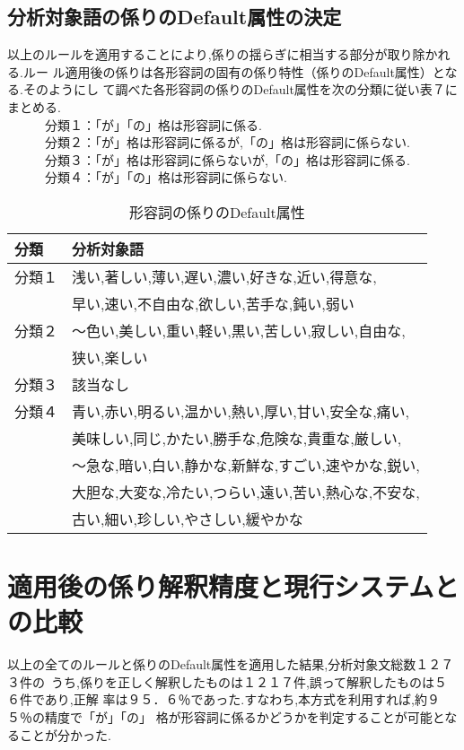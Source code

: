 \subsection{分析対象語の係りのDefault属性の決定}

以上のルールを適用することにより,係りの揺らぎに相当する部分が取り除かれる.ルー
ル適用後の係りは各形容詞の固有の係り特性（係りのDefault属性）となる.そのようにし
て調べた各形容詞の係りのDefault属性を次の分類に従い表７にまとめる.\\
　　　分類１：「が」「の」格は形容詞に係る.\\
　　　分類２：「が」格は形容詞に係るが,「の」格は形容詞に係らない.\\
　　　分類３：「が」格は形容詞に係らないが,「の」格は形容詞に係る.\\
　　　分類４：「が」「の」格は形容詞に係らない.
\begin{table}[h]
\caption{形容詞の係りのDefault属性}
\begin{center}
  \begin{tabular}{|l|l|} \hline
    分類 & 分析対象語 \\ \hline
    分類１ & 浅い,著しい,薄い,遅い,濃い,好きな,近い,得意な, \\
    & 早い,速い,不自由な,欲しい,苦手な,鈍い,弱い\\ \hline
    分類２ & 〜色い,美しい,重い,軽い,黒い,苦しい,寂しい,自由な,\\
    & 狭い,楽しい\\ \hline
    分類３ & 該当なし \\ \hline
    分類４ & 青い,赤い,明るい,温かい,熱い,厚い,甘い,安全な,痛い,\\
    & 美味しい,同じ,かたい,勝手な,危険な,貴重な,厳しい,\\
    & 〜急な,暗い,白い,静かな,新鮮な,すごい,速やかな,鋭い,\\
    & 大胆な,大変な,冷たい,つらい,遠い,苦い,熱心な,不安な,\\
    & 古い,細い,珍しい,やさしい,緩やかな\\ \hline
  \end{tabular}
\end{center}
\end{table}


\section{適用後の係り解釈精度と現行システムとの比較}

以上の全てのルールと係りのDefault属性を適用した結果,分析対象文総数\mbox{１２７３件の
うち,}係りを正しく解釈したものは１２１７件,誤って解釈したものは５６件であり,正解
率は９５．６％であった.すなわち,本方式を利用すれば,約９５％の精度で「が」「の」
格が形容詞に係るかどうかを判定することが可能となることが分かった.

